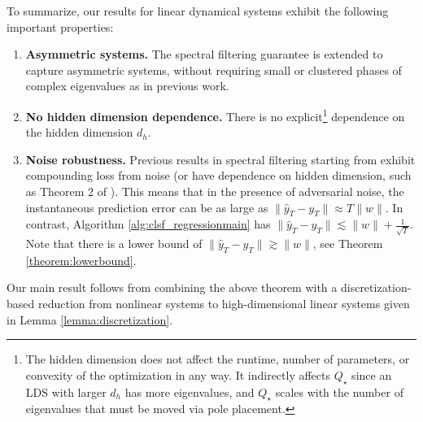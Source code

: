 \documentclass[11pt]{article}
\numberwithin{equation}{section}
\begin{document}
To summarize, our results for linear dynamical systems exhibit the following important properties: 
\begin{enumerate}
    \item {\bf Asymmetric systems.} The spectral filtering guarantee is extended to capture asymmetric systems, without requiring small or clustered phases of complex eigenvalues as in previous work. 
    
    \item {\bf No hidden dimension dependence.} There is no explicit\footnote{The hidden dimension does not affect the runtime, number of parameters, or convexity of the optimization in any way. It indirectly affects $Q_\star$ since an LDS with larger $d_h$ has more eigenvalues, and $Q_\star$ scales with the number of eigenvalues that must be moved via pole placement.} dependence on the hidden dimension $d_h$.
    
    \item {\bf Noise robustness.}  Previous results in spectral filtering starting from \cite{hazan2017learning} exhibit compounding loss from noise (or have dependence on hidden dimension, such as Theorem 2 of \cite{hazan2018spectral}). This means that in the presence of adversarial noise, the instantaneous prediction error can be as large as $\|\hat{y}_T - y_T\| \approx T \|w\|$. In contrast, Algorithm \ref{alg:clsf_regressionmain} has  $\|\hat{y}_T - y_T\| \lesssim \|w\| +  \frac{1}{\sqrt{T} }$. Note that there is a lower bound of $\|\hat{y}_T - y_T\| \gtrsim \|w\|$, see Theorem \ref{theorem:lowerbound}.
    

\end{enumerate}
Our main result follows from combining the above theorem with a discretization-based reduction from nonlinear systems to high-dimensional linear systems given in Lemma \ref{lemma:discretization}.







\end{document}
